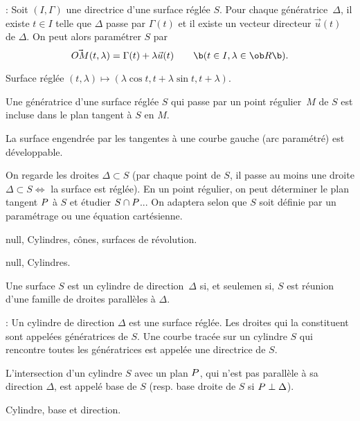 \Remarque : Soit $(I,\Gamma)$ une directrice d'une surface réglée $S$. 
Pour chaque génératrice~$\Delta$, il existe $t\in I$ telle que $\Delta$ 
passe par $\Gamma(t)$ et il existe un vecteur directeur $\vec u(t)$ de $\Delta$. 
On peut alors paramétrer $S$ par 
$$
\vec{OM}(t,\lambda)=\Gamma(t)+\lambda\vec u(t)\qquad\b(t\in I,\lambda\in\ob R\b).
$$ 
\centerline{%
}%
\Figure [Index=Surfaces!Intersection]  Surface réglée $(t,\lambda)\mapsto( \lambda\cos t,t+\lambda\sin t,
t+\lambda)$.

\Propriete [] Une génératrice d'une surface réglée $S$ qui passe 
par un point régulier~$M$ de $S$ est incluse 
dans le plan tangent à $S$ en $M$. 
\bigskip

\Theoreme [] La surface engendrée par les tangentes à une courbe gauche (arc paramétré) 
est développable. 
\bigskip

On regarde les droites $\Delta\subset S$ \pn(par chaque point de $S$, 
il passe au moins une droite 
$\Delta\subset S\Leftrightarrow$ la surface est réglée). \medskip\noindent 
En un point régulier, on peut déterminer le plan tangent $\sc P$ à $S$ 
et étudier $S\cap \sc P$... \medskip\pn
On adaptera selon que $S$ soit définie par un paramétrage ou une équation cartésienne. 
\bigskip

\Section null, Cylindres, cônes, surfaces de révolution.

\Subsection null, Cylindres.

Une surface $S$ est un cylindre de direction~$\Delta$ si, et seulemen si, $S$ 
est réunion d'une famille de droites parallèles à $\Delta$.  
\bigskip

\Remarque : Un cylindre de direction $\Delta$ est une surface réglée. \pn 
Les droites qui la constituent sont appelées génératrices de $S$. \pn
Une courbe tracée sur un cylindre $S$ qui rencontre toutes les génératrices est appelée 
une directrice de $S$. 
\bigskip

\Definition [] L'intersection d'un cylindre $S$ avec un plan $\sc P$, qui n'est pas parallèle 
à sa direction $\Delta$, est appelé base de $S$ 
(resp. base droite de $S$ si $\sc P\perp\Delta$). 

\centerline{%
}%
\Figure [Index=Surfaces!Cylindre]  Cylindre, base et direction.

